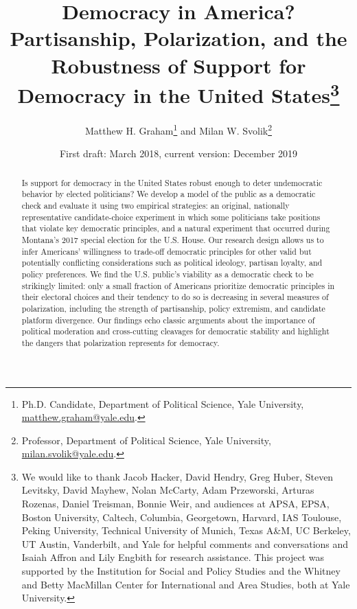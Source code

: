 \documentclass[letterpaper, 12pt]{article}
\title{\vspace*{-2em}Democracy in America? \\ Partisanship, Polarization, and the Robustness of Support for Democracy in the United States\thanks{We would like to thank Jacob Hacker, David Hendry, Greg Huber, Steven Levitsky, David Mayhew, Nolan McCarty, Adam Przeworski, Arturas Rozenas, Daniel Treisman, Bonnie Weir, and audiences at APSA, EPSA, Boston University, Caltech, Columbia, Georgetown, Harvard, IAS Toulouse, Peking University, Technical University of Munich, Texas A\&M, UC Berkeley, UT Austin, Vanderbilt, and Yale for helpful comments and conversations and Isaiah Affron and Lily Engbith for research assistance. This project was supported by the Institution for Social and Policy Studies and the Whitney and Betty MacMillan Center for International and Area Studies, both at Yale University.}}
\author{Matthew H. Graham\thanks{Ph.D. Candidate, Department of Political Science, Yale University, \href{email:matthew.graham@yale.edu}{matthew.graham@yale.edu}.} \hspace{1mm} and Milan W. Svolik\thanks{Professor, Department of Political Science, Yale University, \href{email:milan.svolik@yale.edu}{milan.svolik@yale.edu}.}}
\date{First draft: March 2018, current version: December 2019}
\begin{document}
\begin{titlepage}
\maketitle
\thispagestyle{empty}

\begin{abstract}
\singlespacing
Is support for democracy in the United States robust enough to deter undemocratic behavior by elected politicians? We develop a model of the public as a democratic check and evaluate it using two empirical strategies: an original, nationally representative candidate-choice experiment in which some politicians take positions that violate key democratic principles, and a natural experiment that occurred during Montana's 2017 special election for the U.S. House. Our research design allows us to infer Americans' willingness to trade-off democratic principles for other valid but potentially conflicting considerations such as political ideology, partisan loyalty, and policy preferences. We find the U.S. public's viability as a democratic check to be strikingly limited: only a small fraction of Americans prioritize democratic principles in their electoral choices and their tendency to do so is decreasing in several measures of polarization, including the strength of partisanship, policy extremism, and candidate platform divergence. Our findings echo classic arguments about the importance of political moderation and cross-cutting cleavages for democratic stability and highlight the dangers that polarization represents for democracy.
\end{abstract}

\end{titlepage}
\end{document}
